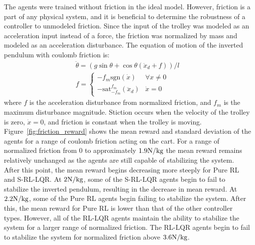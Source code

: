 The agents were trained without friction in the ideal model. However, friction is a part of any physical system, and it is beneficial to determine the robustness of a controller to unmodeled friction. Since the input of the trolley was modeled as an acceleration input instead of a force, the friction was normalized by mass and modeled as an acceleration disturbance. The equation of motion of the inverted pendulum with coulomb friction is:
%
\begin{gather}
    \ddot{\theta} = (g\sin{\theta} + \cos{\theta} (\ddot{x}_d + f))/l\\
    f = \left\{
            \begin{array}{cl}
                - f_m \text{sgn}(\dot{x}) & \forall x \neq 0\\
                -\text{sat}^{f_m}_{-f_m}(\ddot{x}_d) & \dot{x} = 0
            \end{array}
    \right.
\end{gather}
%
where $f$ is the acceleration disturbance from normalized friction, and $f_m$ is the maximum disturbance magnitude. Stiction occurs when the velocity of the trolley is zero, $\dot{x}=0$, and friction is constant when the trolley is moving.
Figure~\ref{fig:friction_reward} shows the mean reward and standard deviation of the agents for a range of coulomb friction acting on the cart.
%
For a range of normalized friction from $0$ to approximately $1.9\si[per-mode=symbol]{\newton\per\kilo\gram}$ the mean reward remains relatively unchanged as the agents are still capable of stabilizing the system. After this point, the mean reward begins decreasing more steeply for Pure RL and S-RL-LQR. At $2\si[per-mode=symbol]{\newton\per\kilo\gram}$, some of the S-RL-LQR agents begin to fail to stabilize the inverted pendulum, resulting in the decrease in mean reward. At $2.2\si[per-mode=symbol]{\newton\per\kilo\gram}$, some of the Pure RL agents begin failing to stabilize the system. After this, the mean reward for Pure RL is lower than that of the other controller types. However, all of the RL-LQR agents maintain the ability to stabilize the system for a larger range of normalized friction. The RL-LQR agents begin to fail to stabilize the system for normalized friction above $3.6\si[per-mode=symbol]{\newton\per\kilo\gram}$.


